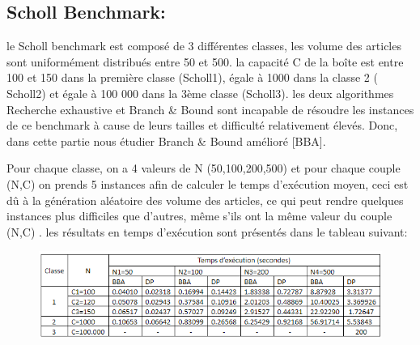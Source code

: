 \documentclass[12pt]{article}
\begin{document}
\subsection{Scholl Benchmark:}
le Scholl benchmark est composé de 3 différentes classes, les volume des articles sont uniformément distribués entre 50 et 500. la capacité C de la boîte est entre 100 et 150 dans la première classe (Scholl1), égale à 1000 dans la classe 2 ( Scholl2) et égale à 100 000 dans la 3ème classe (Scholl3). 
les deux algorithmes Recherche exhaustive et Branch \& Bound sont incapable de résoudre les instances de ce benchmark à cause de leurs tailles et difficulté relativement élevés. Donc, dans cette partie nous étudier Branch \& Bound amélioré [BBA]. 

Pour chaque classe, on a 4 valeurs de N (50,100,200,500) et pour chaque couple (N,C) on prends 5 instances afin de calculer le temps d'exécution moyen, ceci est dû à la génération aléatoire des volume des articles, ce qui peut rendre quelques instances plus difficiles que d’autres, même s’ils ont la même valeur du couple (N,C) . les résultats en temps d'exécution sont présentés dans le tableau suivant:
\begin{figure}[H]
    \includegraphics[width=13.5cm]{../figures/tab2.png}
\end{figure}
\end{document}
